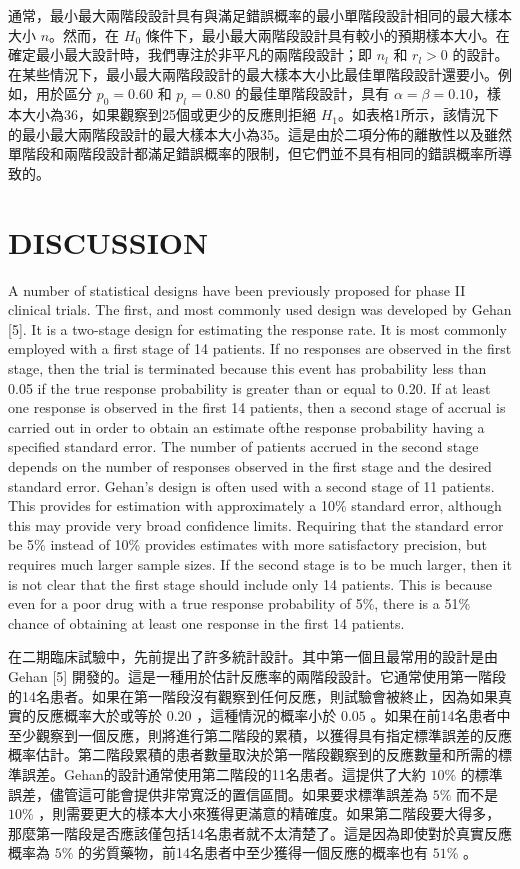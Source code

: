 	通常，最小最大兩階段設計具有與滿足錯誤概率的最小單階段設計相同的最大樣本大小 $n$。然而，在 $H_0$ 條件下，最小最大兩階段設計具有較小的預期樣本大小。在確定最小最大設計時，我們專注於非平凡的兩階段設計；即 $n_l$ 和 $r_l > 0$ 的設計。在某些情況下，最小最大兩階段設計的最大樣本大小比最佳單階段設計還要小。例如，用於區分 $p_0 = 0.60$ 和 $p_l = 0.80$ 的最佳單階段設計，具有 $ \alpha = \beta = 0.10$，樣本大小為36，如果觀察到25個或更少的反應則拒絕 $H_1$。如表格1所示，該情況下的最小最大兩階段設計的最大樣本大小為35。這是由於二項分佈的離散性以及雖然單階段和兩階段設計都滿足錯誤概率的限制，但它們並不具有相同的錯誤概率所導致的。

\section{DISCUSSION}
	A number of statistical designs have been previously proposed for phase II clinical trials. The first, and most commonly used design was developed by Gehan [5]. It is a two-stage design for estimating the response rate. It is most commonly employed with a first stage of 14 patients. If no responses are observed in the first stage, then the trial is terminated because this event has probability less than 0.05 if the true response probability is greater than or equal to 0.20. If at least one response is observed in the first 14 patients, then a second stage of accrual is carried out in order to obtain an estimate ofthe response probability having a specified standard error. The number of patients accrued in the second stage depends on the number of responses observed in the first stage and the desired standard error. Gehan's design is often used with a second stage of 11 patients. This provides for estimation with approximately a 10\% standard error, although this may provide very broad confidence limits. Requiring that the standard error be 5\% instead of 10\% provides estimates with more satisfactory precision, but requires much larger sample sizes. If the second stage is to be much larger, then it is not clear that the first stage should include only 14 patients. This is because even for a poor drug with a true response probability of 5\%, there is a 51\% chance of obtaining at least one response in the first 14 patients. 

	在二期臨床試驗中，先前提出了許多統計設計。其中第一個且最常用的設計是由Gehan [5] 開發的。這是一種用於估計反應率的兩階段設計。它通常使用第一階段的14名患者。如果在第一階段沒有觀察到任何反應，則試驗會被終止，因為如果真實的反應概率大於或等於 $0.20$ ，這種情況的概率小於 $0.05$ 。如果在前14名患者中至少觀察到一個反應，則將進行第二階段的累積，以獲得具有指定標準誤差的反應概率估計。第二階段累積的患者數量取決於第一階段觀察到的反應數量和所需的標準誤差。Gehan的設計通常使用第二階段的11名患者。這提供了大約 $10\%$ 的標準誤差，儘管這可能會提供非常寬泛的置信區間。如果要求標準誤差為 $5\%$ 而不是 $10\%$ ，則需要更大的樣本大小來獲得更滿意的精確度。如果第二階段要大得多，那麼第一階段是否應該僅包括14名患者就不太清楚了。這是因為即使對於真實反應概率為 $5\%$ 的劣質藥物，前14名患者中至少獲得一個反應的概率也有 $51\%$ 。

